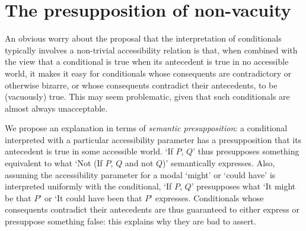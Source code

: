 \documentclass[If.tex]{subfiles}
\begin{document}

\section{The presupposition of non-vacuity}
\label{sect:nonvacuity}
An obvious worry about the proposal that the interpretation of conditionals typically involves a non-trivial accessibility relation is that, when combined with the view that a conditional is true when its antecedent is true in no accessible world, it makes it easy for conditionals whose consequents are contradictory or otherwise bizarre, or whose consequents contradict their antecedents, to be (vacuously) true.  This may seem problematic, given that such conditionals are almost always unacceptable.

We propose an explanation in terms of \emph{semantic presupposition}: a conditional interpreted with a particular accessibility parameter has a presupposition that its antecedent is true in some accessible world.  ‘If $P$, $Q$’ thus presupposes something equivalent to what ‘Not (If $P$, $Q$ and not $Q$)’ semantically expresses.  Also, assuming the accessibility parameter for a modal ‘might’ or ‘could have’ is interpreted uniformly with the conditional, ‘If $P$, $Q$’ presupposes what ‘It might be that $P$’ or ‘It could have been that $P$’ expresses.  Conditionals whose consequents contradict their antecedents are thus guaranteed to either express or presuppose something false: this explains why they are bad to assert.
\end{document}
